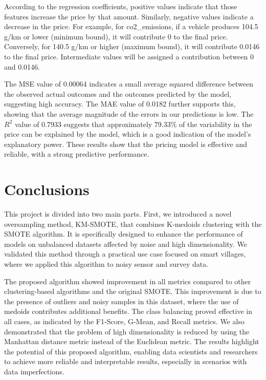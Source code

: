 \documentclass[12pt]{book}
\begin{document}
According to the regression coefficients, positive values indicate that those features increase the price by that amount. Similarly, negative values indicate a decrease in the price. For example, for co2\_emissions, if a vehicle produces 104.5 g/km or lower (minimum bound), it will contribute 0 to the final price. Conversely, for 140.5 g/km or higher (maximum bound), it will contribute 0.0146 to the final price. Intermediate values will be assigned a contribution between 0 and 0.0146.




The MSE value of 0.00064 indicates a small average squared difference between the observed actual outcomes and the outcomes predicted by the model, suggesting high accuracy. The MAE value of 0.0182 further supports this, showing that the average magnitude of the errors in our predictions is low. The $R^2$ value of 0.7933 suggests that approximately 79.33\% of the variability in the price can be explained by the model, which is a good indication of the model's explanatory power. These results show that the pricing model is effective and reliable, with a strong predictive performance.


\chapter{Conclusions} \label{sec:conclusion}

This project is divided into two main parts. First, we introduced a novel oversampling method, KM-SMOTE, that combines K-medoids clustering with the SMOTE algorithm. It is specifically designed to enhance the performance of models on unbalanced datasets affected by noise and high dimensionality. We validated this method through a practical use case focused on smart villages, where we applied this algorithm to noisy sensor and survey data.

The proposed algorithm showed improvement in all metrics compared to other clustering-based algorithms and the original SMOTE. This improvement is due to the presence of outliers and noisy samples in this dataset, where the use of medoids contributes additional benefits. The class balancing proved effective in all cases, as indicated by the F1-Score, G-Mean, and Recall metrics. We also demonstrated that the problem of high dimensionality is reduced by using the Manhattan distance metric instead of the Euclidean metric. The results highlight the potential of this proposed algorithm, enabling data scientists and researchers to achieve more reliable and interpretable results, especially in scenarios with data imperfections.
\end{document}
